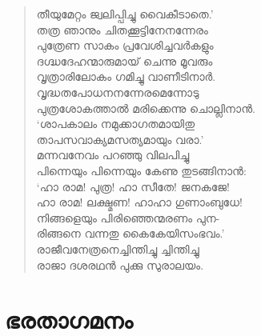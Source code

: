 \begin{verse}
തീയുമേറ്റം ജ്വലിപ്പിച്ചു വൈകീടാതെ.’\\
തത്ര ഞാനും ചിതക്കൂട്ടിനേനന്നേരം\\
പുത്രേണ സാകം പ്രവേശിച്ചവര്‍കളും\\
ദഗ്ദ്ധദേഹന്മാരുമായ് ചെന്നു മൂവരും\\
വൃത്രാരിലോകം ഗമിച്ചു വാണീടിനാര്‍.\\
വൃദ്ധതപോധനനന്നേരമെന്നോടു\\
പുത്രശോകത്താല്‍ മരിക്കെന്നു ചൊല്ലിനാന്‍.\\
‘ശാപകാലം നമുക്കാഗതമായിതു\\
താപസവാക്യമസത്യമായും വരാ.’\\
മന്നവനേവം പറഞ്ഞു വിലപിച്ചു\\
പിന്നെയും പിന്നെയും കേണു തുടങ്ങിനാന്‍:\\
‘ഹാ രാമ! പുത്ര! ഹാ സീതേ! ജനകജേ!\\
ഹാ രാമ! ലക്ഷ്മണ! ഹാഹാ ഗുണാംബുധേ!\\
നിങ്ങളെയും പിരിഞ്ഞെന്മരണം പുന-\\
രിങ്ങനെ വന്നതു കൈകേയിസംഭവം.’\\
രാജീവനേത്രനെച്ചിന്തിച്ചു ച്ചിന്തിച്ചു\\
രാജാ ദശരഥന്‍ പുക്കു സുരാലയം.
\end{verse}


\section{ഭരതാഗമനം}

